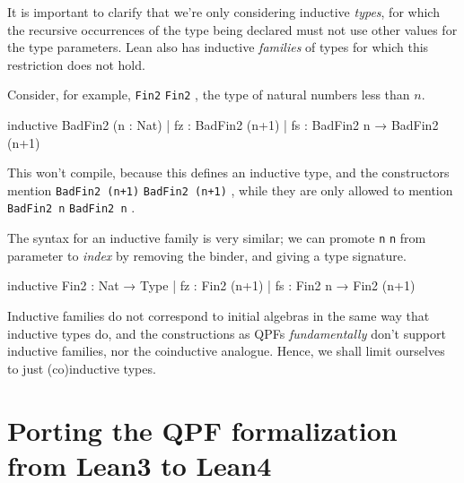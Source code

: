 \documentclass[titlepage]{report}
\newcommand\lean[1]{%
\ifx\leanmode\undefined%
\def\leanmode{1}%
\texttt{\small #1}%
\undef\leanmode%
\else%
\texttt{#1}%
\fi%
}
\begin{document}
It is important to clarify that we're only considering inductive \emph{types}, 
for which the recursive occurrences of the type being declared must not use other values for the type parameters. Lean also has inductive \emph{families} of types for which this restriction does not hold.

Consider, for example, \lean{Fin2}, the type of natural numbers less than $n$.
\begin{badleancode}
    inductive BadFin2 (n : Nat)
    | fz : BadFin2 (n+1)
    | fs : BadFin2 n → BadFin2 (n+1)
\end{badleancode}

This won't compile, because this defines an inductive type, and the constructors mention \lean{BadFin2 (n+1)}, while they are only allowed to mention \lean{BadFin2 n}.

The syntax for an inductive family is very similar; we can promote \lean{n} from parameter to \emph{index} by removing the binder, and giving a type signature.

\begin{leancode}
    inductive Fin2 : Nat → Type
    | fz : Fin2 (n+1)
    | fs : Fin2 n → Fin2 (n+1)
\end{leancode}

Inductive families do not correspond to initial algebras in the same way that inductive types do, and the constructions as QPFs \emph{fundamentally} don't support inductive families, nor the coinductive analogue.
Hence, we shall limit ourselves to just (co)inductive types.




\chapter{Porting the QPF formalization from Lean3 to Lean4}
\label{ch:porting}
\end{document}
